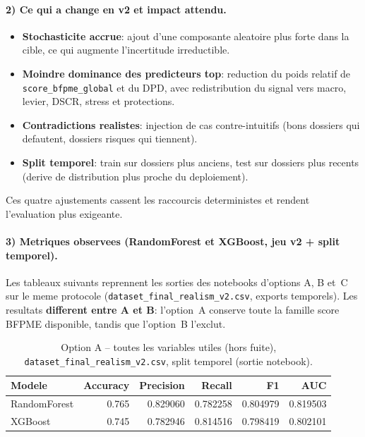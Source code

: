 \documentclass[11pt,a4paper]{article}
\begin{document}
\paragraph{2) Ce qui a change en v2 et impact attendu.}
\begin{itemize}[leftmargin=1.2cm]
  \item \textbf{Stochasticite accrue}: ajout d'une composante aleatoire plus forte dans la cible, ce qui augmente l'incertitude irreductible.
  \item \textbf{Moindre dominance des predicteurs top}: reduction du poids relatif de \texttt{score\_bfpme\_global} et du DPD, avec redistribution du signal vers macro, levier, DSCR, stress et protections.
  \item \textbf{Contradictions realistes}: injection de cas contre-intuitifs (bons dossiers qui defautent, dossiers risques qui tiennent).
  \item \textbf{Split temporel}: train sur dossiers plus anciens, test sur dossiers plus recents (derive de distribution plus proche du deploiement).
\end{itemize}

Ces quatre ajustements cassent les raccourcis deterministes et rendent l'evaluation plus exigeante.

\paragraph{3) Metriques observees (RandomForest et XGBoost, jeu v2 + split temporel).}
Les tableaux suivants reprennent les sorties des notebooks d'options A, B et~C sur le meme protocole (\texttt{dataset\_final\_realism\_v2.csv}, exports temporels). Les resultats \textbf{different entre A et B}: l'option~A conserve toute la famille score BFPME disponible, tandis que l'option~B l'exclut.

\begin{table}[h]
  \centering
  \caption{Option A -- toutes les variables utiles (hors fuite), \texttt{dataset\_final\_realism\_v2.csv}, split temporel (sortie notebook).}
  \begin{tabular}{lrrrrr}
    \toprule
    Modele & Accuracy & Precision & Recall & F1 & AUC \\
    \midrule
    RandomForest & 0.765 & 0.829060 & 0.782258 & 0.804979 & 0.819503 \\
    XGBoost      & 0.745 & 0.782946 & 0.814516 & 0.798419 & 0.802101 \\
    \bottomrule
  \end{tabular}
\end{table}
\end{document}
